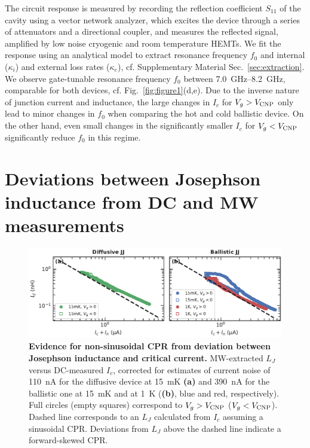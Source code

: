 The circuit response is measured by recording the reflection coefficient $S_{11}$ of the cavity using a vector network analyzer, which excites the device through a series of attenuators and a directional coupler, and measures the reflected signal, amplified by low noise cryogenic and room temperature HEMTs. 
%
We fit the response using an analytical model to extract resonance frequency $f_0$ and internal ($\kappa_i$) and external loss rates ($\kappa_e$), cf. Supplementary Material Sec.~\ref{sec:extraction}.
%
We observe gate-tunable resonance frequency $f_0$ between \SIrange{7.0}{8.2}{\giga\hertz}, comparable for both devices, cf. Fig.~\ref{fig:figure1}(d,e).
%
Due to the inverse nature of junction current and inductance, the large changes in $I_c$ for $V_g>V_{\rm CNP}$ only lead to minor changes in $f_0$ when comparing the hot and cold ballistic device.
%
On the other hand, even small changes in the significantly smaller $I_c$ for $V_g<V_{\rm CNP}$ significantly reduce $f_0$ in this regime.

\section{Deviations between Josephson inductance from DC and MW measurements}

\begin{figure}[t]
	\centering
	\includegraphics[width=\linewidth]{chapter-gJJ-CPR/figs/SMFigure2}
	\caption{
		\textbf{Evidence for non-sinusoidal CPR from deviation between Josephson inductance and critical current.}
		MW-extracted $L_J$ versus DC-measured $I_c$, corrected for estimates of current noise of \SI{110}{\nano\ampere} for the diffusive device at \SI{15}{\milli\kelvin} \textbf{(a)} and \SI{390}{\nano\ampere} for the ballistic one at \SI{15}{\milli\kelvin} and at \SI{1}{\kelvin} (\textbf{(b)}, blue and red, respectively).
		Full circles (empty squares) correspond to $V_g>V_{\rm CNP}$ ($V_g<V_{\rm CNP}$).
		Dashed line corresponds to an $L_J$ calculated from $I_c$ assuming a sinusoidal CPR.
		Deviations from $L_J$ above the dashed line indicate a forward-skewed CPR.
	}
	\label{fig:figure2}
\end{figure}

